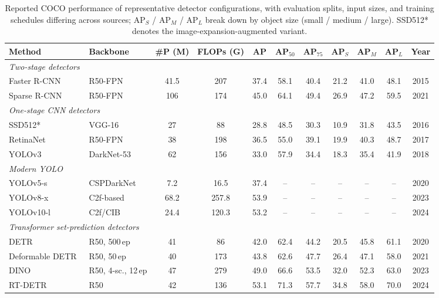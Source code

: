 \begin{table}[!t]
\centering
\caption{Reported COCO performance of representative detector configurations, with evaluation splits, input sizes, and training schedules differing across sources; AP$_S$ / AP$_M$ / AP$_L$ break down by object size (small / medium / large). SSD512* denotes the image-expansion-augmented variant.}
\label{tab:objdet_coco_results}
\fontsize{9}{11}\selectfont
\setlength{\tabcolsep}{1.5mm}
\begin{tabular}{l l c c c c c c c c c}
\toprule
\textbf{Method} & \textbf{Backbone} & \textbf{\#P (M)} & \textbf{FLOPs (G)} & \textbf{AP} & \textbf{AP$_{50}$} & \textbf{AP$_{75}$} & \textbf{AP$_S$} & \textbf{AP$_M$} & \textbf{AP$_L$} & \textbf{Year} \\
\midrule
\multicolumn{11}{l}{\emph{Two-stage detectors}} \\
Faster R-CNN~\cite{ren2015faster}            & R50-FPN     & 41.5 & 207   & 37.4 & 58.1 & 40.4 & 21.2 & 41.0 & 48.1 & 2015 \\
Sparse R-CNN~\cite{sun2021sparsercnn}        & R50-FPN     & 106  & 174   & 45.0 & 64.1 & 49.4 & 26.9 & 47.2 & 59.5 & 2021 \\
\midrule
\multicolumn{11}{l}{\emph{One-stage CNN detectors}} \\
SSD512*~\cite{liu2016ssd}                     & VGG-16      & 27   & 88    & 28.8 & 48.5 & 30.3 & 10.9 & 31.8 & 43.5 & 2016 \\
RetinaNet~\cite{lin2017focal}                & R50-FPN     & 38   & 198   & 36.5 & 55.0 & 39.1 & 19.9 & 40.3 & 48.7 & 2017 \\
YOLOv3~\cite{redmon2018yolov3}               & DarkNet-53  & 62   & 156   & 33.0 & 57.9 & 34.4 & 18.3 & 35.4 & 41.9 & 2018 \\
\midrule
\multicolumn{11}{l}{\emph{Modern YOLO}} \\
YOLOv5-s~\cite{jocher2020yolov5}             & CSPDarkNet  & 7.2  & 16.5  & 37.4 & --   & --   & --   & --   & --   & 2020 \\
YOLOv8-x~\cite{jocher2023yolov8}             & C2f-based    & 68.2 & 257.8 & 53.9 & --   & --   & --   & --   & --   & 2023 \\
YOLOv10-l~\cite{wang2024yolov10}             & C2f/CIB    & 24.4 & 120.3 & 53.2 & --   & --   & --   & --   & --   & 2024 \\
\midrule
\multicolumn{11}{l}{\emph{Transformer set-prediction detectors}} \\
DETR~\cite{carion2020end}                    & R50, 500\,ep & 41   & 86    & 42.0 & 62.4 & 44.2 & 20.5 & 45.8 & 61.1 & 2020 \\
Deformable DETR~\cite{Zhu2021DeformableDETR} & R50, 50\,ep  & 40   & 173   & 43.8 & 62.6 & 47.7 & 26.4 & 47.1 & 58.0 & 2021 \\
DINO~\cite{zhang2023dino}                    & R50, 4-sc., 12\,ep & 47 & 279 & 49.0 & 66.6 & 53.5 & 32.0 & 52.3 & 63.0 & 2023 \\
RT-DETR~\cite{zhao2024detrs}                 & R50          & 42   & 136   & 53.1 & 71.3 & 57.7 & 34.8 & 58.0 & 70.0 & 2024 \\
\bottomrule
\end{tabular}
\end{table}
